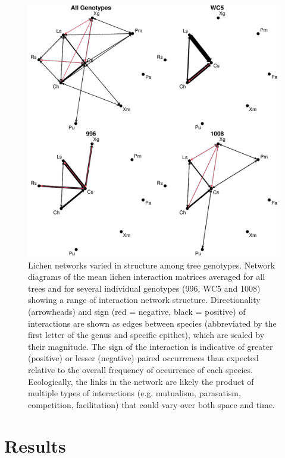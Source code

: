 \documentclass[11pt,twocolumn,twoside,lineno]{pnas-new}
\begin{document}
{\begin{figure}[ht]
\centering
\includegraphics[width=\linewidth]{cn_onc.pdf}
\caption{Lichen networks varied in structure among tree
  genotypes. Network diagrams of the mean lichen interaction matrices
  averaged for all trees and for several individual genotypes (996,
  WC5 and 1008) showing a range of interaction network
  structure. Directionality (arrowheads) and sign (red = negative,
  black = positive) of interactions are shown as edges between species
  (abbreviated by the first letter of the genus and specific epithet),
  which are scaled by their magnitude. The sign of the interaction is
  indicative of greater (positive) or lesser (negative) paired
  occurrences than expected relative to the overall frequency of
  occurrence of each species. Ecologically, the links in the network
  are likely the product of multiple types of interactions
  (e.g. mutualism, parasatism, competition, facilitation) that could
  vary over both space and time.}
\label{fig:geno_nets}
\end{figure}
}

\showmatmethods{} %

\section*{Results}
\end{document}
